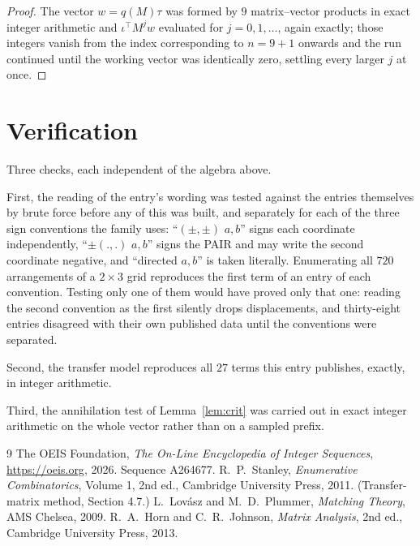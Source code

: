\documentclass[11pt,a4paper]{article}
\theoremstyle{plain}
\theoremstyle{definition}
\begin{document}
\begin{proof}
The vector $w=q(M)\tau$ was formed by $9$ matrix--vector products in exact integer
arithmetic and $\iota^{\!\top}M^{j}w$ evaluated for $j=0,1,\dots$, again exactly; those
integers vanish from the index corresponding to $n=9+1$ onwards and the run continued
until the working vector was identically zero, settling every larger $j$ at once.
\end{proof}

\section{Verification}

Three checks, each independent of the algebra above.

First, the reading of the entry's wording was tested against the entries themselves by brute
force before any of this was built, and separately for each of the three sign conventions the
family uses: ``$(\pm,\pm)$ $a,b$'' signs each coordinate independently, ``$\pm(.,.)$ $a,b$''
signs the PAIR and may write the second coordinate negative, and ``directed $a,b$'' is taken
literally. Enumerating all $720$ arrangements of a $2\times3$ grid reproduces the first term
of an entry of each convention. Testing only one of them would have proved only that one:
reading the second convention as the first silently drops displacements, and thirty-eight
entries disagreed with their own published data until the conventions were separated.

Second, the transfer model reproduces all $27$ terms this entry publishes, exactly, in
integer arithmetic.

Third, the annihilation test of Lemma~\ref{lem:crit} was carried out in exact integer
arithmetic on the whole vector rather than on a sampled prefix.

\begin{thebibliography}{9}
 The OEIS Foundation, \emph{The On-Line Encyclopedia of Integer
Sequences}, \url{https://oeis.org}, 2026. Sequence A264677.
 R.~P.~Stanley, \emph{Enumerative Combinatorics}, Volume 1, 2nd ed.,
Cambridge University Press, 2011. (Transfer-matrix method, Section 4.7.)
 L.~Lov\'asz and M.~D.~Plummer, \emph{Matching Theory}, AMS Chelsea, 2009.
 R.~A.~Horn and C.~R.~Johnson, \emph{Matrix Analysis}, 2nd ed., Cambridge
University Press, 2013.
\end{thebibliography}
\end{document}

